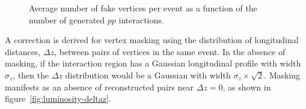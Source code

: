 \begin{figure}[h]
	\centering
	\caption{Average number of fake vertices per event as a function of the number of generated $pp$ interactions. }
	\label{fig:fake-fractions}
\end{figure}


A correction is derived for vertex masking using the distribution of longitudinal distances, $\Delta z$, between pairs of vertices in the same event. In the absence of masking, if the interaction region has a Gaussian longitudinal profile with width $\sigma_z$, then the $\Delta z$ distribution would be a Gaussian with width $\sigma_z\times\sqrt{2}$. Masking manifests as an absence of reconstructed pairs near $\Delta z=0$, as shown in figure~\ref{fig:luminosity-deltaz}. 

